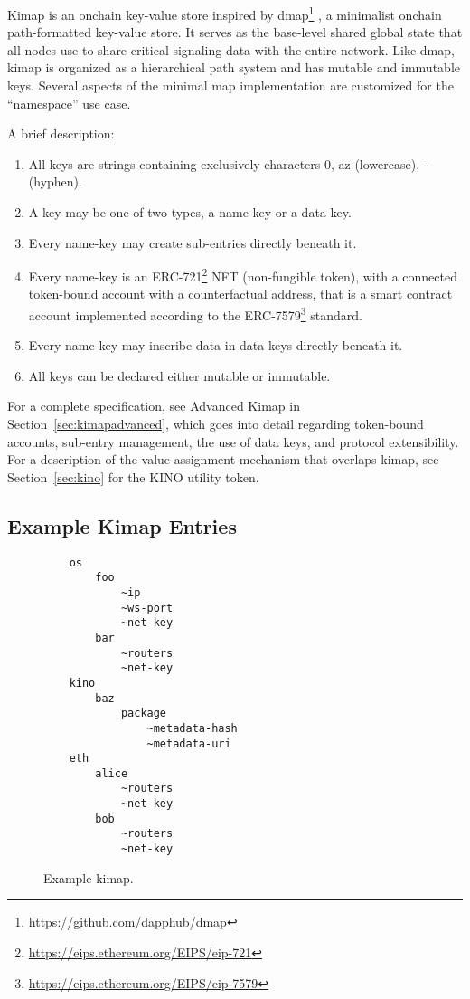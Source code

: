 \documentclass[runningheads]{llncs}
\begin{document}
Kimap is an onchain key-value store inspired by dmap\footnote{\url{https://github.com/dapphub/dmap}}
, a minimalist onchain path-formatted key-value store.
It serves as the base-level shared global state that all nodes use to share critical signaling data with the entire network.
Like dmap, kimap is organized as a hierarchical path system and has mutable and immutable keys.
Several aspects of the minimal map implementation are customized for the ``namespace'' use case.

A brief description:

\begin{enumerate}
    \item All keys are strings containing exclusively characters 0, a\textendash z (lowercase), - (hyphen).
    \item A key may be one of two types, a name-key or a data-key.
    \item Every name-key may create sub-entries directly beneath it.
    \item Every name-key is an ERC-721\footnote{\url{https://eips.ethereum.org/EIPS/eip-721}} NFT (non-fungible token),
    with a connected token-bound account with a counterfactual address,
    that is a smart contract account implemented according to the ERC-7579\footnote{\url{https://eips.ethereum.org/EIPS/eip-7579}} standard.
    \item Every name-key may inscribe data in data-keys directly beneath it.
    \item All keys can be declared either mutable or immutable.
\end{enumerate}

For a complete specification, see Advanced Kimap in Section~\ref{sec:kimapadvanced}, which goes into detail regarding token-bound accounts, sub-entry management, the use of data keys, and protocol extensibility.
For a description of the value-assignment mechanism that overlaps kimap, see Section~\ref{sec:kino} for the KINO utility token.

\subsection{Example Kimap Entries}

\begin{figure}[H]
    \centering
    \begin{verbatim}
    os
        foo
            ~ip
            ~ws-port
            ~net-key
        bar
            ~routers
            ~net-key
    kino
        baz
            package
                ~metadata-hash
                ~metadata-uri
    eth
        alice
            ~routers
            ~net-key
        bob
            ~routers
            ~net-key
    \end{verbatim}
    \caption{Example kimap.}
    \label{fig:example kimap}
\end{figure}
\end{document}

